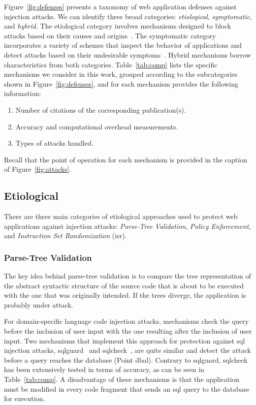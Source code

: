 \documentclass[conference]{IEEEtran}
\begin{document}
Figure~\ref{fig:defenses} presents a taxonomy of 
web application defenses against injection attacks.
We can identify three broad categories:
{\it etiological}, {\it symptomatic}, and {\it hybrid}.
The etiological category involves mechanisms designed to
block attacks based on their causes and origins~\cite{JL75,L81}. 
The symptomatic category incorporates a variety of schemes that
inspect the behavior of applications and detect attacks based on
their undesirable symptoms~\cite{D76,A00}.
Hybrid mechanisms borrow characteristics from both
categories. Table~\ref{tab:comp} lists the specific mechanisms we consider
in this work, grouped according to the subcategories shown in
Figure~\ref{fig:defenses}, and for each mechanism
provides the following information:

\begin{enumerate}
\item Number of citations of the corresponding publication(s).
\item Accuracy and computational overhead measurements.
\item Types of attacks handled.
\end{enumerate}

\noindent
Recall that the point of operation for each mechanism is provided
in the caption of Figure~\ref{fig:attacks}.

\subsection{Etiological}
\label{sec:prot}

There are three main categories of etiological approaches used to protect web
applications against injection attacks:
\emph{Parse-Tree Validation},
\emph{Policy Enforcement}, and
\emph{Instruction Set Randomization} ({\sc isr}).

\subsubsection{Parse-Tree Validation}
\label{sec:tree}

The key idea behind parse-tree validation is to compare the tree
representation of the abstract syntactic structure of the source code
that is about to be executed with the one that was originally
intended. If the trees diverge, the application is probably under
attack.

For domain-specific language code injection attacks, mechanisms check 
the query before the inclusion of user input with the one
resulting after the inclusion of user input.
Two mechanisms that implement this approach for protection
against {\sc sql} injection attacks,
{\sc sqlg}uard~\cite{BWS05} and
{\sc sql}check~\cite{SW06}, are quite similar
and detect the attack before a query reaches the
database (Point {\sc dbal}).
Contrary to {\sc sqlg}uard,
{\sc sql}check has been
extensively tested in terms of accuracy,
as can be seen in Table~\ref{tab:comp}.
A disadvantage of these mechanisms is that the
application must be modified in every code fragment
that sends an {\sc sql} query to the database for execution.
\end{document}
